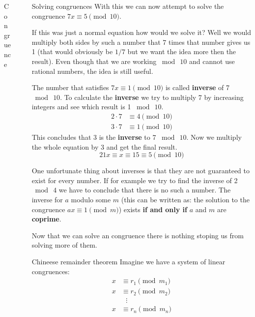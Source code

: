 \documentclass[final]{beamer}
\newlength{\sepwidth}
\newlength{\colwidth}
\newcommand{\separatorcolumn}{\begin{column}{\sepwidth}\end{column}}
\begin{document}
\begin{frame}[t]
\begin{columns}[t]
\begin{column}{\colwidth}
\begin{block}{Congruence}
\end{block}  
\end{column}

\separatorcolumn
\begin{column}{\colwidth}

\begin{exampleblock}{Solving congruences}
 With this we can now attempt to solve the congruence $7x \equiv 5 \pmod{10}$. 

 If this was just a normal equation how would we solve it? Well we would multiply
both sides by such a number that 7 times that number gives us 1 (that would
obviously be $1 / 7$ but we want the idea more then the result). Even though that we are working
$\bmod~10$ and cannot use rational numbers, the idea is still useful.

The number that satisfies $7x \equiv 1 \pmod{10}$ is called \textbf{inverse} of
7 $\bmod~10$. To calculate the \textbf{inverse} we try
to multiply 7 by increasing integers and see which result is 1 $\bmod~10$. 
\begin{equation*}
   \begin{split}
    2 \cdot 7 & \equiv 4 \pmod{10}\\
    3 \cdot 7 & \equiv 1 \pmod{10}
   \end{split}
  \end{equation*}
This concludes that 3 is the \textbf{inverse} to 7 $\bmod~10$. Now we multiply
the whole equation by 3 and get the final result.
\[
 21x \equiv x \equiv 15 \equiv 5 \pmod{10}
\]

One unfortunate thing about inverses is that they are not guaranteed to exist for
every number. If for example we try to find the inverse of 2 $\bmod~4$ we have
to conclude that there is no such a number. The inverse for $a$ modulo some $m$
(this can be written as: the solution to the congruence $ax \equiv 1 \pmod{m}$)
exists \textbf{if and only if} $a$ and $m$ are \textbf{coprime}.

Now that we can solve an congruence there is nothing stoping us from solving
more of them.
\end{exampleblock}


\begin{alertblock}{Chineese remainder theorem}
 Imagine we have a system of linear congruences:
   \begin{equation*}
   \begin{split}
    x & \equiv r_1 \pmod{m_1}\\
    x & \equiv r_2 \pmod{m_2}\\
      &~~~\vdots\\
    x & \equiv r_n \pmod{m_n}
   \end{split}
  \end{equation*}


\end{alertblock}
\end{column}
\end{columns}
\end{frame}
\end{document}
